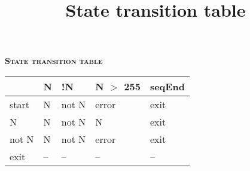 \documentclass[12pt]{article}
\title {State transition table}
\begin{document}
	\begin{center}
		{\large \textbf{\textsc{State transition table}}}\\\vspace{12mm}

		\begin{tabular}{ | l | l | l | l | l |}
			\hline
    			& N & !N & N $>$ 255 & seqEnd 	 \\  \hline
			start & N & not N & error & exit \\ \hline
			N & N & not N & N & exit 	 \\ \hline
			not N & N & not N & error & exit \\ \hline
			exit  & -- & -- & -- & -- 	 \\ \hline	
		\end{tabular}
	\end{center}
\end{document}
